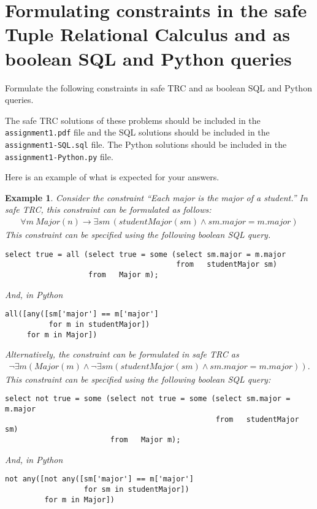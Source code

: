 \documentclass{article}
\newtheorem{example}{Example}
\begin{document}
\section{Formulating constraints in the safe Tuple Relational Calculus and as boolean SQL and Python queries}

Formulate the following constraints in safe TRC and as boolean SQL and Python queries.    

The safe TRC solutions of these problems should be included in the {\tt assignment1.pdf} file and
the SQL solutions should be included in the {\tt assignment1-SQL.sql} file.
The Python solutions should be included in the {\tt assignment1-Python.py} file.

Here is an example of what is expected for your answers.

\begin{example}
Consider the constraint ``\emph{Each major is the major of a student.}''
In safe TRC, this constraint can be formulated as follows:
$$
\begin{array}{l}
\forall m\ Major(n) \rightarrow \exists sm\, (studentMajor(sm) \land sm.major = m.major)
\end{array}
$$
This constraint can be specified using the following boolean SQL query.
\begin{verbatim}
select true = all (select true = some (select sm.major = m.major
                                       from   studentMajor sm)
                   from   Major m);                    
\end{verbatim}
And, in Python
\begin{verbatim}
all([any([sm['major'] == m['major']
          for m in studentMajor])
     for m in Major])
\end{verbatim}
Alternatively, the constraint can be formulated in safe TRC as
$$
\begin{array}{l}
\lnot \exists m (Major(m) \land \lnot \exists sm (studentMajor(sm) \land sm.major = m.major)).
\end{array}
$$
This constraint can be specified using the following boolean SQL query:

\begin{verbatim}
select not true = some (select not true = some (select sm.major = m.major
                                                from   studentMajor sm)
                        from   Major m);
\end{verbatim}
And, in Python
\begin{verbatim}
not any([not any([sm['major'] == m['major']
                  for sm in studentMajor])
         for m in Major])
\end{verbatim}


\end{example}
\end{document}
